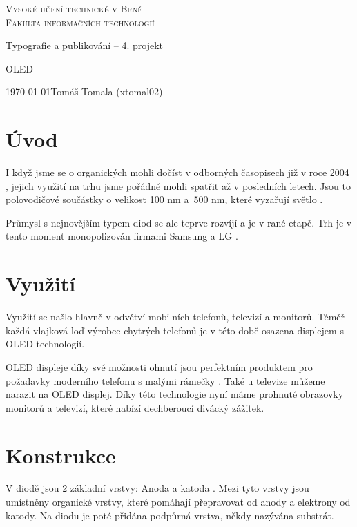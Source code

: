 \documentclass[a4paper, 11pt]{article}
\begin{document}
 \begin{titlepage} 
    \begin{center}
        \thispagestyle{empty}
        \Huge \textsc{Vysoké učení technické v Brně}\\
        \huge \textsc{Fakulta informačních technologií}


        \LARGE Typografie a publikování – 4. projekt

        \Huge OLED
        \end{center}
    {\Large \today  \hfill Tomáš Tomala (xtomal02)}
 \end{titlepage}

\section*{Úvod} 
I když jsme se o organických  mohli dočíst v odborných časopisech již v roce 2004 \cite{MaximumPC}, jejich využití na trhu jsme pořádně mohli spatřit až v posledních letech. Jsou to polovodičové součástky o velikost 100 nm a~500 nm, které vyzařují světlo \cite{BartosikThesis}.

Průmysl s nejnovějším typem diod se ale teprve rozvíjí a je v rané etapě. Trh je v tento moment monopolizován firmami Samsung a LG \cite{MarkShar}.

\section{Využití}

Využití se našlo hlavně v odvětví mobilních telefonů, televizí a monitorů. Téměř každá vlajková loď výrobce chytrých telefonů je v této době osazena displejem s OLED technologií. 

OLED displeje díky své možnosti ohnutí jsou perfektním produktem pro požadavky moderního telefonu s malými rámečky \cite{OLEDINFO}. Také u televize můžeme narazit na OLED displej. Díky této technologie nyní máme prohnuté obrazovky monitorů a televizí, které nabízí dechberoucí divácký zážitek.
\section{Konstrukce}
V diodě jsou 2 základní vrstvy: Anoda a katoda \cite{HruskaThesis}. Mezi tyto vrstvy jsou umístněny organické vrstvy, které pomáhají přepravovat  od anody a elektrony od katody. Na diodu je poté přidána podpůrná vrstva, někdy nazývána substrát.
\end{document}
